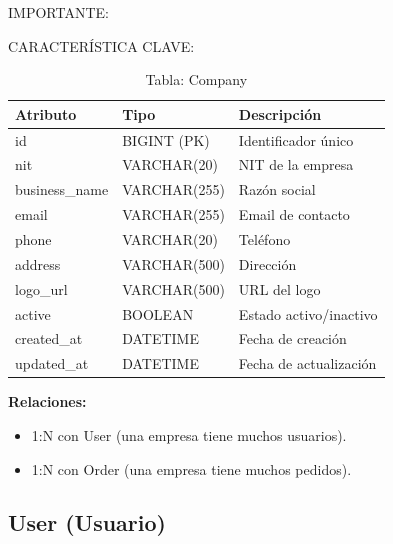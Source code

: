 \documentclass[12pt,a4paper,oneside]{book}
\begin{document}
\begin{alert}{IMPORTANTE:}
\begin{info}{CARACTERÍSTICA CLAVE:}
\begin{table}[ht]
    \centering
    \caption{Tabla: Company}
    \begin{tabular}{@{}lll@{}}
        \toprule
        \textbf{Atributo} & \textbf{Tipo} & \textbf{Descripción} \\
        \midrule
        id & BIGINT (PK) & Identificador único \\
        nit & VARCHAR(20) & NIT de la empresa \\
        business\_name & VARCHAR(255) & Razón social \\
        email & VARCHAR(255) & Email de contacto \\
        phone & VARCHAR(20) & Teléfono \\
        address & VARCHAR(500) & Dirección \\
        logo\_url & VARCHAR(500) & URL del logo \\
        active & BOOLEAN & Estado activo/inactivo \\
        created\_at & DATETIME & Fecha de creación \\
        updated\_at & DATETIME & Fecha de actualización \\
        \bottomrule
    \end{tabular}
\end{table}

\textbf{Relaciones:}
\begin{itemize}
    \item 1:N con User (una empresa tiene muchos usuarios).
    \item 1:N con Order (una empresa tiene muchos pedidos).
\end{itemize}

\subsection{User (Usuario)}
\label{sec:user}


\end{info}
\end{alert}
\end{document}
